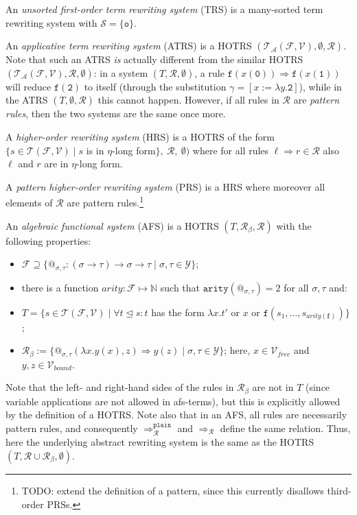 \documentclass{lmcs}
\theoremstyle{theorem}\newtheorem{theorem}[dummy]{Theorem}
\theoremstyle{theorem}\newtheorem{lemma}[dummy]{Lemma}
\theoremstyle{theorem}\newtheorem{corollary}[dummy]{Corollary}
\theoremstyle{definition}\newtheorem{definition}[dummy]{Definition}
\theoremstyle{definition}\newtheorem{example}[dummy]{Example}
\newcommand{\F}{\mathcal{F}}
\newcommand{\V}{\mathcal{V}}
\newcommand{\Vfree}{\mathcal{V}_{\mathit{free}}}
\newcommand{\Vbound}{\mathcal{V}_{\mathit{bound}}}
\newcommand{\Sorts}{\mathcal{S}}
\newcommand{\Types}{\mathcal{Y}}
\newcommand{\Terms}{\mathcal{T}}
\newcommand{\ATerms}{\mathcal{T}_{\mathcal{A}}}
\newcommand{\Rules}{\mathcal{R}}
\newcommand{\identifier}[1]{\mathtt{#1}}
\newcommand{\afun}{\identifier{f}}
\newcommand{\avar}{x}
\newcommand{\bvar}{y}
\newcommand{\cvar}{z}
\newcommand{\abs}[2]{\lambda #1.#2}
\newcommand{\arity}{\mathit{arity}}
\newcommand{\arrtype}{\rightarrow}
\newcommand{\arrz}{\Rightarrow}
\newcommand{\arr}[1]{\arrz_{#1}}
\newcommand{\subtermeq}{\unlhd}
\newcommand{\symb}[1]{\mathtt{#1}}
\newcommand{\nul}{\symb{0}}
\newcommand{\unitsort}{\mathtt{o}}
\begin{document}
An \emph{unsorted first-order term rewriting system} (TRS) is a many-sorted term rewriting system
with $\Sorts = \{ \unitsort \}$.

An \emph{applicative term rewriting system} (ATRS) is a HOTRS $(\ATerms(\F,\V),\emptyset,\Rules)$.
Note that such an ATRS \emph{is} actually different from the similar HOTRS
$(\ATerms(\F,\V),\Rules,\emptyset)$: in a system $(T,\Rules,\emptyset)$, a rule
$\afun(\avar(\nul)) \arrz \afun(\avar(\symb{1}))$ will reduce $\afun(\symb{2})$ to itself
(through the substitution $\gamma = [\avar:=\abs{\bvar}{\symb{2}}]$), while in the ATRS
$(T,\emptyset,\Rules)$ this cannot happen.  However, if all rules in $\Rules$ are
\emph{pattern rules}, then the two systems are the same once more.

A \emph{higher-order rewriting system} (HRS) is a HOTRS of the form
$\{ s \in \Terms(\F,\V) \mid s$ is in $\eta$-long form$\},\ \Rules,\ \emptyset)$ where for all
rules $\ell \arrz r \in \Rules$ also $\ell$ and $r$ are in $\eta$-long form.

A \emph{pattern higher-order rewriting system} (PRS) is a HRS where moreover all elements of
$\Rules$ are pattern rules.\footnote{TODO: extend the definition of a pattern, since this
currently disallows third-order PRSs.}

An \emph{algebraic functional system} (AFS) is a HOTRS $(T,\Rules_\beta,\Rules)$ with the
following properties:
\begin{itemize}
\item $\F \supseteq \{ @_{\sigma,\tau} : (\sigma \arrtype \tau) \arrtype \sigma \arrtype \tau
  \mid \sigma,\tau \in \Types \}$;
\item there is a function $\mathit{arity} : \F \mapsto \mathbb{N}$ such that
  $\mathtt{arity}(@_{\sigma,\tau}) = 2$ for all $\sigma,\tau$ and:
\item[] $T = \{ s \in \Terms(\F,\V) \mid \forall t \subtermeq s: t$ has the form
  $\abs{x}{t'}$ or $x$ or $\afun(s_1,\dots,s_{\arity(\afun)})\}$;
\item $\Rules_\beta := \{ @_{\sigma,\tau}(\abs{\avar}{\bvar(\avar)},\cvar) \arrz \bvar(\cvar)
  \mid \sigma,\tau \in \Types \}$; here, $\avar \in \Vfree$ and $\bvar,\cvar \in \Vbound$.
\end{itemize}
Note that the left- and right-hand sides of the rules in $\Rules_\beta$ are not in $T$ (since
variable applications are not allowed in afs-terms), but this is explicitly allowed by the
definition of a HOTRS. Note also that in an AFS, all rules are necessarily pattern rules, and
consequently $\arr{\Rules}^{\mathtt{plain}}$ and $\arr{\Rules}$ define the same relation.
Thus, here the underlying abstract rewriting system is the same as the HOTRS $(T,\Rules \cup
\Rules_\beta,\emptyset)$.
\end{document}
